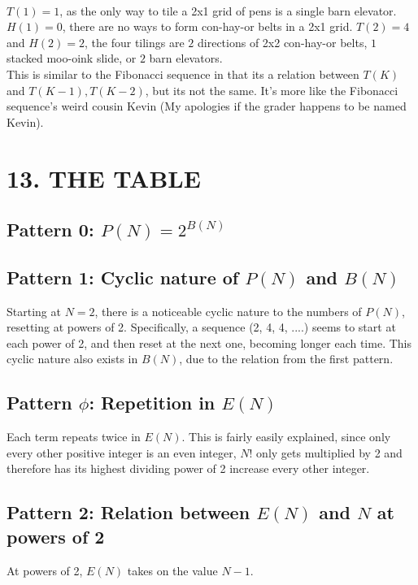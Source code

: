 \documentclass{article}
\begin{document}
\\$T(1)=1$, as the only way to tile a 2x1 grid of pens is a single barn elevator. $H(1)=0$, there are no ways to form con-hay-or belts in a 2x1 grid. $T(2)=4$ and $H(2)=2$, the four tilings are $2$ directions of 2x2 con-hay-or belts, $1$ stacked moo-oink slide, or $2$ barn elevators.  
\\This is similar to the Fibonacci sequence in that its a relation between $T(K)$ and $T(K-1), T(K-2)$, but its not the same. It's more like the Fibonacci sequence's weird cousin Kevin (My apologies if the grader happens to be named Kevin).
\pagebreak
\section*{13. THE TABLE}
\subsection*{Pattern 0: $P(N)=2^{B(N)}$}

\subsection*{Pattern 1: Cyclic nature of $P(N)$ and $B(N)$}
Starting at $N=2$, there is a noticeable cyclic nature to the numbers of $P(N)$, resetting at powers of 2. Specifically, a sequence (2, 4, 4, ....) seems to start at each power of 2, and then reset at the next one, becoming longer each time. This cyclic nature also exists in $B(N)$, due to the relation from the first pattern.
\subsection*{Pattern $\phi$: Repetition in $E(N)$}
Each term repeats twice in $E(N)$. This is fairly easily explained, since only every other positive integer is an even integer, $N!$ only gets multiplied by 2 and therefore has its highest dividing power of 2 increase every other integer.
\subsection*{Pattern 2: Relation between $E(N)$ and $N$ at powers of 2}
At powers of 2, $E(N)$ takes on the value $N-1$. 
\end{document}
